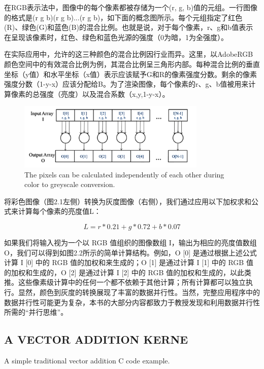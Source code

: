 \documentclass[11pt]{ctexart}
\begin{document}
在RGB表示法中，图像中的每个像素都被存储为一个(r, g, b)值的元组。一行图像的格式是(r g b)(r g b)...(r g b)，如下面的概念图所示。每个元组指定了红色(R)、绿色(G)和蓝色(B)的混合比例。也就是说，对于每个像素，r、g和b值表示在呈现该像素时，红色、绿色和蓝色光源的强度（0为暗，1为全强度）。

在实际应用中，允许的这三种颜色的混合比例因行业而异。这里，以AdobeRGB颜色空间中的有效混合比例为例，其混合比例呈三角形内部。每种混合比例的垂直坐标（y值）和水平坐标（x值）表示应该赋予G和R的像素强度分数。剩余的像素强度分数（1-y-x）应该分配给B。为了渲染图像，每个像素的r、g、b值被用来计算像素的总强度（亮度）以及混合系数（x,y,1-y-x）。

\begin{figure}[ht]
	\centering
	\includegraphics[width=0.8\textwidth]{photos/pixels.png}
	\caption{The pixels can be calculated independently of each other during color to greyscale
		conversion.}
	\label{fig:2}
\end{figure}

将彩色图像（图2.1左侧）转换为灰度图像（右侧），我们通过应用以下加权求和公式来计算每个像素的亮度值L：

\begin{equation}
	L= r*0.21 + g * 0.72 + b *0.07
\end{equation}

如果我们将输入视为一个以 RGB 值组织的图像数组 I，输出为相应的亮度值数组 O，我们可以得到如图2.2所示的简单计算结构。例如，O [0] 是通过根据上述公式计算 I [0] 中的 RGB 值的加权和来生成的；O [1] 是通过计算 I [1] 中的 RGB 值的加权和生成的，O [2] 是通过计算 I [2] 中的 RGB 值的加权和生成的，以此类推。这些像素级计算中的任何一个都不依赖于其他计算；所有计算都可以独立执行。显然，颜色到灰度的转换展现了丰富的数据并行性。当然，完整应用程序中的数据并行性可能更为复杂，本书的大部分内容都致力于教授发现和利用数据并行性所需的“并行思维”。

\subsection{A VECTOR ADDITION KERNE}

A simple traditional vector addition C code example.
\end{document}
